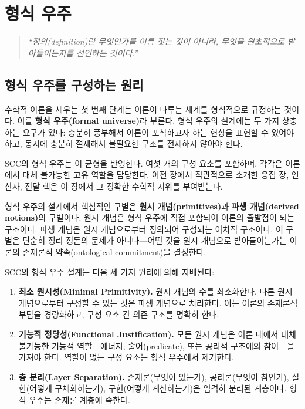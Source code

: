 
\chapter{형식 우주}
\label{ch:formal-universe}

\begin{quote}
\textit{``정의(definition)란 무엇인가를 이름 짓는 것이 아니라, 무엇을 원초적으로 받아들이는지를 선언하는 것이다.''}
\end{quote}

\section{형식 우주를 구성하는 원리}
\label{sec:design-principles}

수학적 이론을 세우는 첫 번째 단계는 이론이 다루는 세계를 형식적으로 규정하는 것이다. 이를 \textbf{형식 우주(formal universe)}라 부른다. 형식 우주의 설계에는 두 가지 상충하는 요구가 있다: 충분히 풍부해서 이론이 포착하고자 하는 현상을 표현할 수 있어야 하고, 동시에 충분히 절제해서 불필요한 구조를 전제하지 않아야 한다.

SCC의 형식 우주는 이 균형을 반영한다. 여섯 개의 구성 요소를 포함하며, 각각은 이론에서 대체 불가능한 고유 역할을 담당한다. 이전 장에서 직관적으로 소개한 응집 장, 연산자, 전달 핵은 이 장에서 그 정확한 수학적 지위를 부여받는다.

형식 우주의 설계에서 핵심적인 구별은 \textbf{원시 개념(primitives)}과 \textbf{파생 개념(derived notions)}의 구별이다. 원시 개념은 형식 우주에 직접 포함되어 이론의 출발점이 되는 구조이다. 파생 개념은 원시 개념으로부터 정의되어 구성되는 이차적 구조이다. 이 구별은 단순히 정리 정돈의 문제가 아니다---어떤 것을 원시 개념으로 받아들이는가는 이론의 존재론적 약속(ontological commitment)을 결정한다.

SCC의 형식 우주 설계는 다음 세 가지 원리에 의해 지배된다:

\begin{enumerate}
    \item \textbf{최소 원시성(Minimal Primitivity).} 원시 개념의 수를 최소화한다. 다른 원시 개념으로부터 구성할 수 있는 것은 파생 개념으로 처리한다. 이는 이론의 존재론적 부담을 경량화하고, 구성 요소 간 의존 구조를 명확히 한다.

    \item \textbf{기능적 정당성(Functional Justification).} 모든 원시 개념은 이론 내에서 대체 불가능한 기능적 역할---에너지, 술어(predicate), 또는 공리적 구조에의 참여---을 가져야 한다. 역할이 없는 구성 요소는 형식 우주에서 제거한다.

    \item \textbf{층 분리(Layer Separation).} 존재론(무엇이 있는가), 공리론(무엇이 참인가), 실현(어떻게 구체화하는가), 구현(어떻게 계산하는가)은 엄격히 분리된 계층이다. 형식 우주는 존재론 계층에 속한다.
\end{enumerate}

